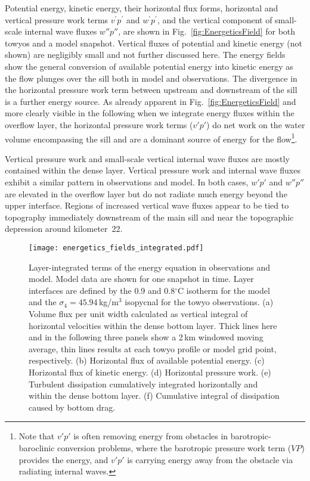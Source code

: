 \documentclass{ametsocV6.1}
\begin{document}
Potential energy, kinetic energy, their horizontal flux forms, horizontal and vertical pressure work terms $v^\prime p^\prime$ and $w^\prime p^\prime$, and the vertical component of small-scale internal wave fluxes $w''p''$, are shown in Fig.~\ref{fig:EnergeticsField} for both towyos and a model snapshot.
Vertical fluxes of potential and kinetic energy (not shown) are negligibly small and not further discussed here.
The energy fields show the general conversion of available potential energy into kinetic energy as the flow plunges over the sill both in model and observations.
The divergence in the horizontal pressure work term between upstream and downstream of the sill is a further energy source.
As already apparent in Fig.~\ref{fig:EnergeticsField} and more clearly visible in the following when we integrate energy fluxes within the overflow layer, the horizontal pressure work terms ($v'p'$) do net work on the water volume encompassing the sill and are a dominant source of energy for the flow\footnote{Note that $v'p'$ is often removing energy from obstacles in barotropic-baroclinic conversion problems, where the barotropic pressure work term ($VP$) provides the energy,  and $v'p'$ is carrying energy away from the obstacle via radiating internal waves.}.

Vertical pressure work and small-scale vertical internal wave fluxes are mostly contained within the dense layer.
Vertical pressure work and internal wave fluxes exhibit a similar pattern in observations and model.
In both cases, $w' p'$ and $w'' p''$ are elevated in the overflow layer but do not radiate much energy beyond the upper interface. 
Regions of increased vertical wave fluxes appear to be tied to topography immediately downstream of the main sill and near the topographic depression around kilometer~22.

\begin{figure}
\centerline{\texttt{[image: energetics\_fields\_integrated.pdf]}}
\caption{
Layer-integrated terms of the energy equation in observations and model.
Model data are shown for one snapshot in time.
Layer interfaces are defined by the 0.9 and 0.8$^{\circ}$C isotherm for the model and the $\sigma_4=45.94$\,kg/m$^3$ isopycnal for the towyo observations.
(a) Volume flux per unit width calculated as vertical integral of horizontal velocities within the dense bottom layer.
Thick lines here and in the following three panels show a 2\,km windowed moving average, thin lines results at each towyo profile or model grid point, respectively.
(b) Horizontal flux of available potential energy.
(c) Horizontal flux of kinetic energy.
(d) Horizontal pressure work.
(e) Turbulent dissipation cumulatively integrated horizontally and within the dense bottom layer. 
(f) Cumulative integral of dissipation caused by bottom drag.
}
\label{fig:EnergeticsFieldsIntegrated}
\end{figure}
\end{document}
